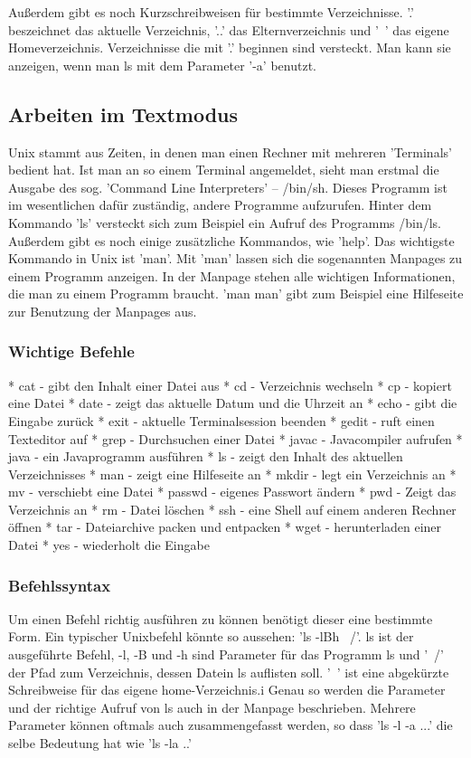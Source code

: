 Außerdem gibt es noch Kurzschreibweisen für bestimmte Verzeichnisse. '.' beszeichnet das aktuelle Verzeichnis, '..' das Elternverzeichnis und '~' das eigene Homeverzeichnis.
Verzeichnisse die mit '.' beginnen sind versteckt. Man kann sie anzeigen, wenn man ls mit dem Parameter '-a' benutzt.

\subsection {Arbeiten im Textmodus}
Unix stammt aus Zeiten, in denen man einen Rechner mit mehreren 'Terminals' bedient hat. Ist man an so einem Terminal angemeldet, sieht man erstmal die Ausgabe des sog. 'Command Line Interpreters' – /bin/sh. Dieses Programm ist im wesentlichen dafür zuständig, andere Programme aufzurufen. Hinter dem Kommando 'ls' versteckt sich zum Beispiel ein Aufruf des Programms /bin/ls. Außerdem gibt es noch einige zusätzliche Kommandos, wie 'help'. Das wichtigste Kommando in Unix ist 'man'. Mit 'man' lassen sich die sogenannten Manpages zu einem Programm anzeigen. In der Manpage stehen alle wichtigen Informationen, die man zu einem Programm braucht.
'man man' gibt zum Beispiel eine Hilfeseite zur Benutzung der Manpages aus.

\subsubsection {Wichtige Befehle}
* cat - gibt den Inhalt einer Datei aus
* cd - Verzeichnis wechseln
* cp - kopiert eine Datei
* date - zeigt das aktuelle Datum und die Uhrzeit an
* echo - gibt die Eingabe zurück
* exit - aktuelle Terminalsession beenden
* gedit - ruft einen Texteditor auf
* grep - Durchsuchen einer Datei
* javac - Javacompiler aufrufen
* java - ein Javaprogramm ausführen
* ls - zeigt den Inhalt des aktuellen Verzeichnisses
* man - zeigt eine Hilfeseite an
* mkdir - legt ein Verzeichnis an
* mv - verschiebt eine Datei
* passwd - eigenes Passwort ändern
* pwd - Zeigt das Verzeichnis an
* rm - Datei löschen
* ssh - eine Shell auf einem anderen Rechner öffnen
* tar - Dateiarchive packen und entpacken
* wget - herunterladen einer Datei
* yes - wiederholt die Eingabe

\subsubsection {Befehlssyntax}
Um einen Befehl richtig ausführen zu können benötigt dieser eine bestimmte Form. Ein typischer Unixbefehl könnte so aussehen:
'ls -lBh ~/'. ls ist der ausgeführte Befehl, -l, -B und -h sind Parameter für das Programm ls und '~/' der Pfad zum Verzeichnis, dessen Datein ls auflisten soll. '~' ist eine abgekürzte Schreibweise für das eigene home-Verzeichnis.i
Genau so werden die Parameter und der richtige Aufruf von ls auch in der Manpage beschrieben. Mehrere Parameter können oftmals auch zusammengefasst werden, so dass 'ls -l -a ...' die selbe Bedeutung hat wie 'ls -la ..'

